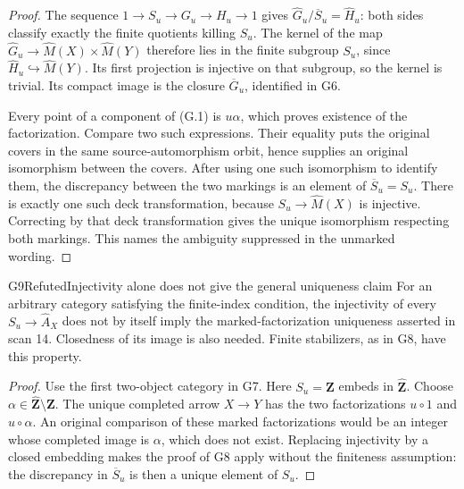 \begin{proof}
The sequence $1\to S_u\to G_u\to H_u\to1$ gives
$\widehat G_u/\overline S_u=\widehat H_u$: both sides classify
exactly the finite quotients killing $S_u$. The kernel of the map
$\widehat G_u\to\widehat M(X)\times\widehat M(Y)$ therefore lies
in the finite subgroup $S_u$, since
$\widehat H_u\hookrightarrow\widehat M(Y)$. Its first projection
is injective on that subgroup, so the kernel is trivial. Its compact
image is the closure $\overline G_u$, identified in G6.

Every point of a component of (G.1) is $u\alpha$, which proves
existence of the factorization. Compare two such expressions. Their
equality puts the original covers in the same source-automorphism
orbit, hence supplies an original isomorphism between the covers.
After using one such isomorphism to identify them, the discrepancy
between the two markings is an element of
$\overline S_u=S_u$. There is exactly one such deck transformation,
because $S_u\to\widehat M(X)$ is injective. Correcting by that deck
transformation gives the unique isomorphism respecting both markings.
This names the ambiguity suppressed in the unmarked wording.
\end{proof}

\begin{result}{G9}{Refuted}{Injectivity alone does not give the general uniqueness claim}
For an arbitrary category satisfying the finite-index condition, the
injectivity of every $S_u\to\widehat A_X$ does not by itself imply the
marked-factorization uniqueness asserted in scan 14. Closedness of its
image is also needed. Finite stabilizers, as in G8, have this property.
\end{result}
\begin{proof}
Use the first two-object category in G7. Here $S_u=\mathbf Z$ embeds
in $\widehat{\mathbf Z}$. Choose
$\alpha\in\widehat{\mathbf Z}\setminus\mathbf Z$. The unique
completed arrow $X\to Y$ has the two factorizations
$u\circ1$ and $u\circ\alpha$. An original comparison of these
marked factorizations would be an integer whose completed image is
$\alpha$, which does not exist. Replacing injectivity by a closed
embedding makes the proof of G8 apply without the finiteness
assumption: the discrepancy in $\overline S_u$ is then a unique
element of $S_u$.
\end{proof}

